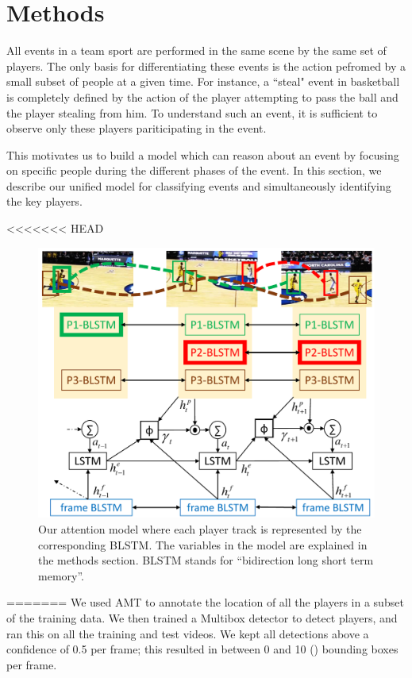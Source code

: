 \section{Methods}
\label{sec:methods}

All events in a team sport are performed in the same scene by the same set
of players. The only basis for differentiating these events is the action
pefromed by a small subset of people at a given time.  For instance, a
``steal" event in basketball is completely defined by the action of the player attempting to
pass the ball and the player stealing from him.  To understand such an event,
it is sufficient to observe only these players pariticipating in the event.

This motivates us to build a model which can reason about an event by focusing
on specific people during the different phases of the event.
In this section, we describe our unified model for classifying events
and simultaneously identifying the key players.

<<<<<<< HEAD
\begin{figure}[t!]
\begin{center}
    \includegraphics[width=3 in]{images/system_figure_1_cropped_v2.pdf}
\end{center}
   \caption{Our attention model where each player track is represented by the
     corresponding BLSTM. The variables in the model are explained in the
     methods section.  BLSTM stands for ``bidirection long short term memory''.
}
\label{fig:model}
\end{figure}
=======
We used AMT to annotate the location of all the players in a subset 
of the training data. We then trained a Multibox detector to detect players,
and ran this on all the training and test videos.  We kept all detections above
a confidence of 0.5 per frame; this resulted in between 0 and 10 () bounding
boxes per frame. 

